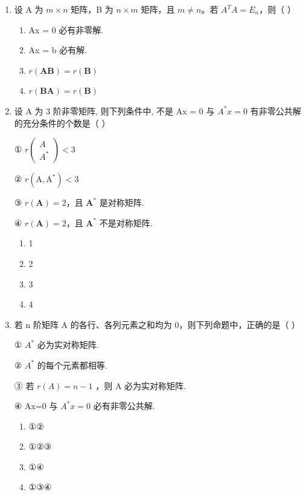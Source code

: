 \documentclass[12pt, a4paper]{ctexart}
\begin{document}
\begin{enumerate}
    \item 设 A 为 $ m \times n $ 矩阵，B 为 $ n \times m $ 矩阵，且 $ m \neq n $。若 $ A^{T}A = E_{n} $，则（ \underline{\hspace{1cm}} ）
    \begin{enumerate}[label=(\Alph*)]
        \item Ax = 0 必有非零解.
        \item Ax = b 必有解.
        \item $ r(\mathbf{A}\mathbf{B}) = r(\mathbf{B}) $
        \item $ r(\mathbf{B}\mathbf{A}) = r(\mathbf{B}) $
    \end{enumerate}

    \item 设 A 为 3 阶非零矩阵, 则下列条件中, 不是 Ax = 0 与 $ A^*x = 0 $ 有非零公共解的充分条件的个数是（ \underline{\hspace{1cm}} ）
    
    ① $ r\begin{pmatrix} A \\ A^{*} \end{pmatrix} < 3 $
    
    ② $ r\left(\mathrm{A},\mathrm{A}^{*}\right) < 3 $
    
    ③ $ r(\mathbf{A}) = 2 $，且 $ \mathbf{A}^* $ 是对称矩阵.
    
    ④ $ r(\mathbf{A}) = 2 $，且 $ \mathbf{A}^* $ 不是对称矩阵.
    \begin{enumerate}[label=(\Alph*)]
        \item 1
        \item 2
        \item 3
        \item 4
    \end{enumerate}

    \item 若 n 阶矩阵 A 的各行、各列元素之和均为 0，则下列命题中，正确的是（ \underline{\hspace{1cm}} ）
    
    ① $ A^{*} $ 必为实对称矩阵.
    
    ② $ A^{*} $ 的每个元素都相等.
    
    ③ 若 $ r(A)=n-1 $ ，则 A 必为实对称矩阵.
    
    ④ Ax=0 与 $ A^{*}x=0 $ 必有非零公共解.
    \begin{enumerate}[label=(\Alph*)]
        \item ①②
        \item ①②③
        \item ①④
        \item ①③④
    \end{enumerate}
\end{enumerate}
\end{document}

